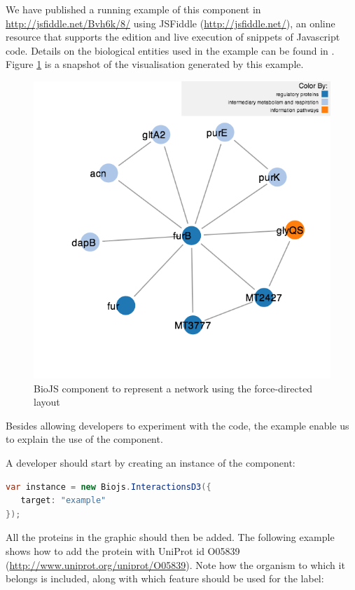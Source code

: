 We have published a running example of this component  in \url{http://jsfiddle.net/Bvh6k/8/} using JSFiddle (\url{http://jsfiddle.net/}), an online resource that supports the edition and live execution of snippets of Javascript code. Details on the biological entities used in the example can be found in \cite{SAL2014}. Figure \ref{fig:biojs_force} is a snapshot of the visualisation generated by this example. 

\begin{figure}[ht]
\centering
\includegraphics[width=4.5in]{figures/force.png}
\caption[BioJS component to represent a network using the force-directed layout]{BioJS component to represent a network using the force-directed layout
\label{fig:biojs_force}}
\end{figure}

Besides allowing developers to experiment with the code, the example enable us to explain the use of the component. 

A developer should start by creating an instance of the component:

\begin{lstlisting}[language=java]
var instance = new Biojs.InteractionsD3({
   target: "example"
});
\end{lstlisting}
					
All the proteins in the graphic should then be added. The following example shows how to add the protein with UniProt id O05839 (\url{http://www.uniprot.org/uniprot/O05839}). Note how the organism to which it belongs is included, along with which feature should be used for the label:

